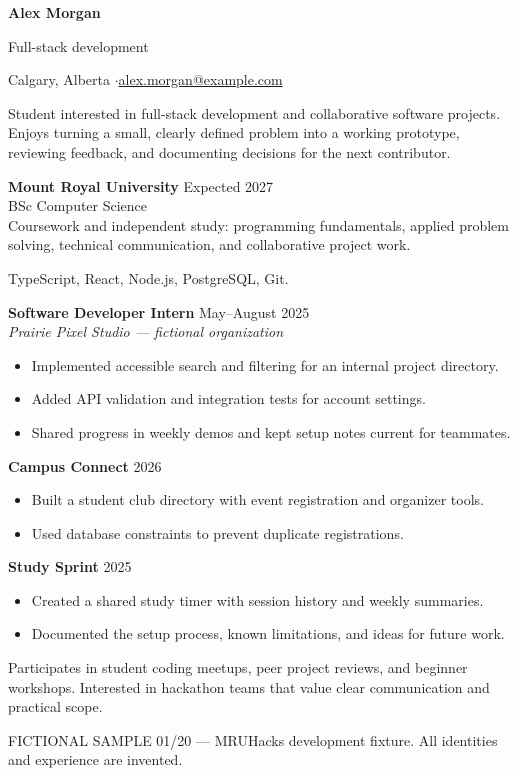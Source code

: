 
{\Huge\bfseries Alex Morgan}\par
{\large\color{accent} Full-stack development}\par
Calgary, Alberta \enspace$\cdot$\enspace \href{mailto:alex.morgan@example.com}{alex.morgan@example.com}

Student interested in full-stack development and collaborative software projects.
Enjoys turning a small, clearly defined problem into a working prototype,
reviewing feedback, and documenting decisions for the next contributor.

\textbf{Mount Royal University} \hfill Expected 2027\\
BSc Computer Science\\
Coursework and independent study: programming fundamentals, applied problem solving,
technical communication, and collaborative project work.

TypeScript, React, Node.js, PostgreSQL, Git.

\textbf{Software Developer Intern} \hfill May--August 2025\\
\textit{Prairie Pixel Studio --- fictional organization}
\begin{itemize}
\item Implemented accessible search and filtering for an internal project directory.
\item Added API validation and integration tests for account settings.
\item Shared progress in weekly demos and kept setup notes current for teammates.
\end{itemize}

\textbf{Campus Connect} \hfill 2026
\begin{itemize}
\item Built a student club directory with event registration and organizer tools.
\item Used database constraints to prevent duplicate registrations.
\end{itemize}
\textbf{Study Sprint} \hfill 2025
\begin{itemize}
\item Created a shared study timer with session history and weekly summaries.
\item Documented the setup process, known limitations, and ideas for future work.
\end{itemize}

Participates in student coding meetups, peer project reviews, and beginner workshops.
Interested in hackathon teams that value clear communication and practical scope.

\vfill
{\footnotesize\color{gray} FICTIONAL SAMPLE 01/20 --- MRUHacks development fixture.
All identities and experience are invented.}

